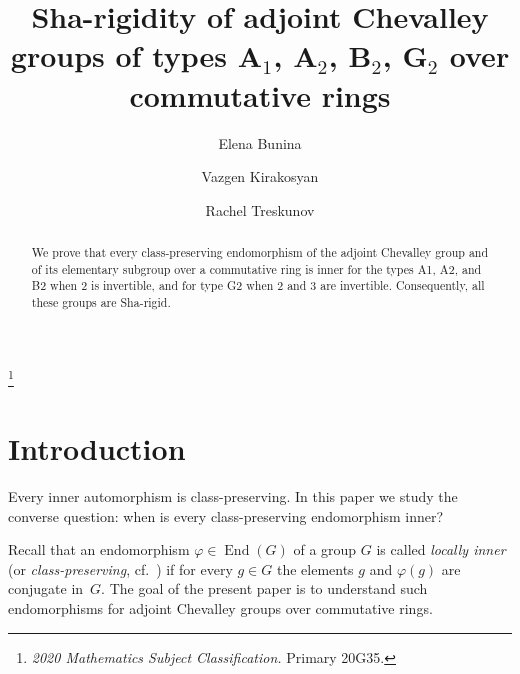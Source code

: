 \documentclass[]{jgcc}
\DeclareMathOperator{\End}{End}
\numberwithin{equation}{section}
\begin{document}

\title[Sha-rigidity of low-rank adjoint Chevalley groups]{Sha-rigidity of adjoint Chevalley groups of types $\mathbf A_1$, $\mathbf A_2$, $\mathbf B_2$, $\mathbf G_2$ over commutative rings}

\author[E.~Bunina]{Elena Bunina}
\address{Department of Mathematics, Bar--Ilan University, 5290002 Ramat Gan, Israel}
\thanks{\textit{2020 Mathematics Subject Classification.} Primary 20G35.}

\author[V.~Kirakosyan]{Vazgen Kirakosyan}
\address{Faculty of Mechanics and Mathematics, Lomonosov Moscow State University, 119991 Moscow, Russia}

\author[R.~Treskunov]{Rachel Treskunov}
\address{Department of Mathematics, Bar--Ilan University, 5290002 Ramat Gan, Israel}


\begin{abstract}
We prove that every class-preserving endomorphism of the adjoint Chevalley group and of its elementary subgroup over a commutative ring is inner for the types A1, A2, and B2 when 2 is invertible, and for type G2 when 2 and 3 are invertible. Consequently, all these groups are Sha-rigid.
\end{abstract}

\maketitle

\section{Introduction}

Every inner automorphism is class-preserving.
In this paper we study the converse question: when is every class-preserving endomorphism inner?

Recall that an endomorphism $\varphi\in\End(G)$ of a group $G$ is called \emph{locally inner}
(or \emph{class-preserving}, cf.~\cite{Sah}) if for every $g\in G$ the elements $g$ and $\varphi(g)$
are conjugate in~$G$.
The goal of the present paper is to understand such endomorphisms for adjoint Chevalley groups
over commutative rings.
\end{document}
